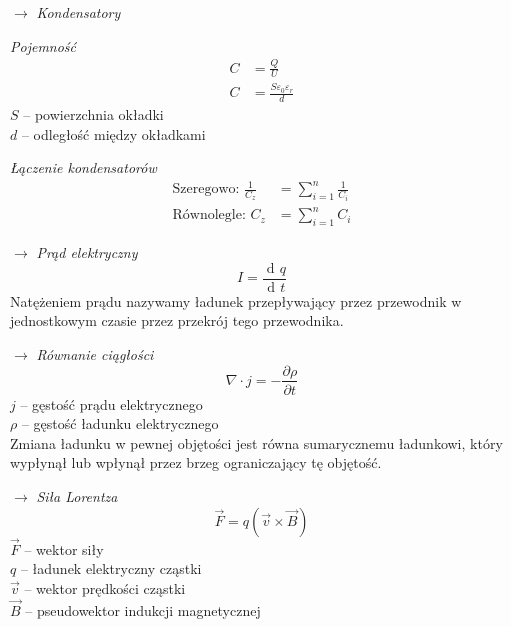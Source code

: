 \documentclass[12pt]{article}
\newenvironment{wzor}[1]{\par{\Large $\longrightarrow$ \textit{#1}}}
    {\newline {\color{grey} \rule{\linewidth}{0.3pt}}}
\DeclareMathOperator{\der}{\operatorname{d}\!}
\begin{document}
\begin{wzor}{Kondensatory}
    \par\textit{Pojemność}
    \begin{align}
        C &= \frac{Q}{U}\\
        C &= \frac{S\varepsilon_0 \varepsilon_r}{d}
    \end{align}
    $S$ -- powierzchnia okładki\\
    $d$ -- odległość między okładkami
    \newpage
    \par \textit{Łączenie kondensatorów} 
    \begin{align}
        \text{Szeregowo: } \frac{1}{C_z} &= \sum\limits_{i=1}^n \frac{1}{C_i} \\
        \text{Równolegle: } C_z &= \sum\limits_{i=1}^n C_i
    \end{align}
\end{wzor}

\begin{wzor}{Prąd elektryczny}
    \begin{equation}
        I = \frac{\der q}{\der t}
    \end{equation}
    Natężeniem prądu nazywamy ładunek przepływający przez przewodnik w jednostkowym czasie
    przez przekrój tego przewodnika.
\end{wzor}

\begin{wzor}{Równanie ciągłości}
    \begin{equation}
        \nabla \cdot j = - \frac{\partial \rho}{\partial t}
    \end{equation}
    $j$ -- gęstość prądu elektrycznego\\
    $\rho$ -- gęstość ładunku elektrycznego\\
    Zmiana ładunku w pewnej objętości jest równa sumarycznemu ładunkowi,
    który wypłynął lub wpłynął przez brzeg ograniczający tę objętość.
\end{wzor}

\begin{wzor}{Siła Lorentza}
    \begin{equation}
        \Vec{F} = q(\Vec{v} \times \Vec{B})
    \end{equation}
    $\Vec{F}$ -- wektor siły\\
    $q$ -- ładunek elektryczny cząstki\\
    $\Vec{v}$ -- wektor prędkości cząstki\\
    $\Vec{B}$ -- pseudowektor indukcji magnetycznej
\end{wzor}
\end{document}
